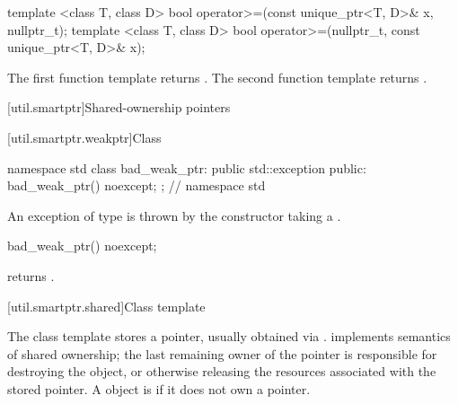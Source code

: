 %
%
\begin{itemdecl}
template <class T, class D>
  bool operator>=(const unique_ptr<T, D>& x, nullptr_t);
template <class T, class D>
  bool operator>=(nullptr_t, const unique_ptr<T, D>& x);
\end{itemdecl}

\begin{itemdescr}
\pnum
\returns
The first function template returns .
The second function template returns .
\end{itemdescr}

%
[util.smartptr]{Shared-ownership pointers}

[util.smartptr.weakptr]{Class }
%
%
\begin{codeblock}
namespace std {
  class bad_weak_ptr: public std::exception {
  public:
    bad_weak_ptr() noexcept;
  };
} // namespace std
\end{codeblock}

\pnum
An exception of type  is thrown by the 
constructor taking a .

%
%
%
\begin{itemdecl}
bad_weak_ptr() noexcept;
\end{itemdecl}

\begin{itemdescr}
\pnum\postconditions  {} returns .
\end{itemdescr}

[util.smartptr.shared]{Class template }

\pnum
{}%
The  class template stores a pointer, usually obtained
via .  implements semantics of shared ownership;
the last remaining owner of the pointer is responsible for destroying
the object, or otherwise releasing the resources associated with the stored pointer. A
 object is  if it does not own a pointer.

